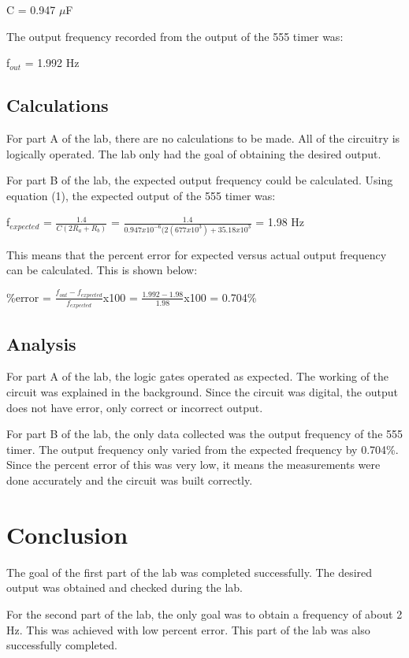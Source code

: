 \documentclass[twocolumn, amsmath]{revtex4}
\begin{document}
C = 0.947 $\mu$F

The output frequency recorded from the output of the 555 timer was:

f$_{out}$ = 1.992 Hz

\subsection{Calculations}
For part A of the lab, there are no calculations to be made. All of the circuitry is logically operated. The lab only had the goal of obtaining the desired output.

For part B of the lab, the expected output frequency could be calculated. %
Using equation (1), the expected output of the 555 timer was:

f$_{expected}$ = $\frac{1.4}{C(2R_a + R_b)}$ = $\frac{1.4}{0.947x10^{-6}(2(677x10^3) + 35.18x10^3}$ = 1.98 Hz

This means that the percent error for expected versus actual output frequency can be calculated. This is shown below:

\%error = $\frac{f_{out} - f_{expected}}{f_{expected}}$x100 = $\frac{1.992 - 1.98}{1.98}$x100 = 0.704\%

\subsection{Analysis}
For part A of the lab, the logic gates operated as expected. The working of the circuit was explained in the background. Since the circuit was digital, the output does not have error, only correct or incorrect output.

For part B of the lab, the only data collected was the output frequency of the 555 timer. The output frequency only varied from the expected frequency by 0.704\%. Since the percent error of this was very low, it means the measurements were done accurately and the circuit was built correctly.





\section{Conclusion}
The goal of the first part of the lab was completed successfully. The desired output was obtained and checked during the lab.

For the second part of the lab, the only goal was to obtain a frequency of about 2 Hz. This was achieved with low percent error. This part of the lab was also successfully completed.
\end{document}
